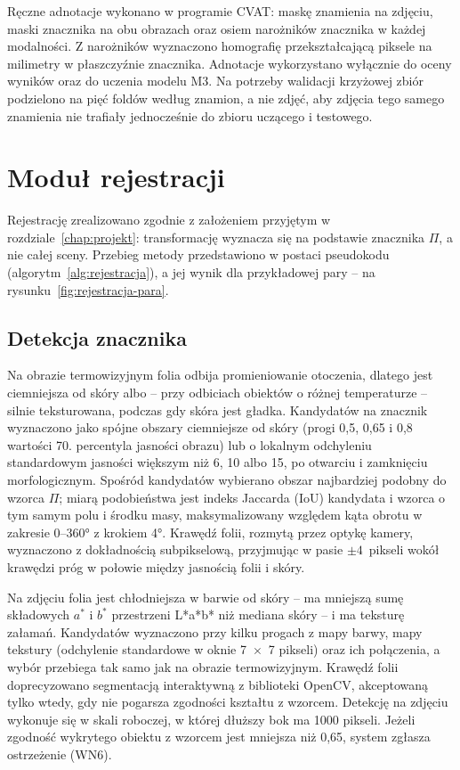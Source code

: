 Ręczne adnotacje wykonano w programie CVAT: maskę znamienia na zdjęciu, maski znacznika na obu obrazach oraz osiem narożników znacznika w każdej modalności. Z narożników wyznaczono homografię przekształcającą piksele na milimetry w płaszczyźnie znacznika. Adnotacje wykorzystano wyłącznie do oceny wyników oraz do uczenia modelu M3. Na potrzeby walidacji krzyżowej zbiór podzielono na pięć foldów według znamion, a nie zdjęć, aby zdjęcia tego samego znamienia nie trafiały jednocześnie do zbioru uczącego i testowego.

\section{Moduł rejestracji}
\label{sec:impl-rejestracja}

Rejestrację zrealizowano zgodnie z założeniem przyjętym w rozdziale~\ref{chap:projekt}: transformację wyznacza się na podstawie znacznika $\Pi$, a nie całej sceny. Przebieg metody przedstawiono w postaci pseudokodu (algorytm~\ref{alg:rejestracja}), a jej wynik dla przykładowej pary -- na rysunku~\ref{fig:rejestracja-para}.

\subsection{Detekcja znacznika}

Na obrazie termowizyjnym folia odbija promieniowanie otoczenia, dlatego jest ciemniejsza od skóry albo -- przy odbiciach obiektów o różnej temperaturze -- silnie teksturowana, podczas gdy skóra jest gładka. Kandydatów na znacznik wyznaczono jako spójne obszary ciemniejsze od skóry (progi 0,5, 0,65 i 0,8 wartości 70. percentyla jasności obrazu) lub o lokalnym odchyleniu standardowym jasności większym niż 6, 10 albo 15, po otwarciu i zamknięciu morfologicznym. Spośród kandydatów wybierano obszar najbardziej podobny do wzorca $\Pi$; miarą podobieństwa jest indeks Jaccarda (IoU) kandydata i wzorca o tym samym polu i środku masy, maksymalizowany względem kąta obrotu w zakresie 0--360° z krokiem 4°. Krawędź folii, rozmytą przez optykę kamery, wyznaczono z dokładnością subpikselową, przyjmując w pasie $\pm 4$~pikseli wokół krawędzi próg w połowie między jasnością folii i skóry.

Na zdjęciu folia jest chłodniejsza w barwie od skóry -- ma mniejszą sumę składowych $a^*$ i $b^*$ przestrzeni L*a*b* niż mediana skóry -- i ma teksturę załamań. Kandydatów wyznaczono przy kilku progach z mapy barwy, mapy tekstury (odchylenie standardowe w oknie 7~$\times$~7 pikseli) oraz ich połączenia, a wybór przebiega tak samo jak na obrazie termowizyjnym. Krawędź folii doprecyzowano segmentacją interaktywną z biblioteki OpenCV, akceptowaną tylko wtedy, gdy nie pogarsza zgodności kształtu z wzorcem. Detekcję na zdjęciu wykonuje się w skali roboczej, w której dłuższy bok ma 1000 pikseli. Jeżeli zgodność wykrytego obiektu z wzorcem jest mniejsza niż 0,65, system zgłasza ostrzeżenie (WN6).


